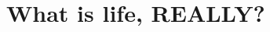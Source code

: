 \documentclass[DIV=calc, paper=a4, fontsize=12pt]{scrartcl}	 %
\begin{document}
\section*{What is life, REALLY?}

\begin{multicols}{2}





\end{multicols}

\onecolumn


\end{document}
